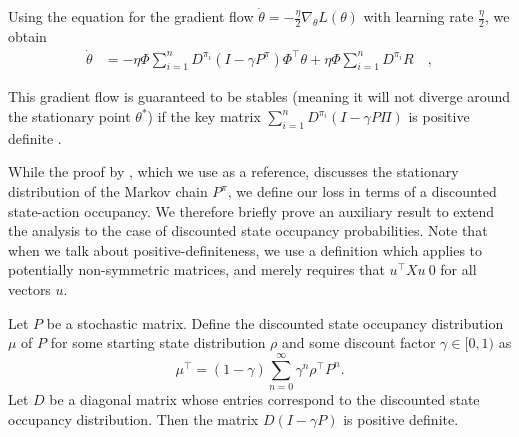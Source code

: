 Using the equation for the gradient flow $\dot{\theta} = - \frac{\eta}{2} \nabla_\theta L(\theta)$ with learning rate $\frac{\eta}{2}$, we obtain
\begin{align}
    \dot\theta &= - \eta \Phi \sum_{i=1}^n D^{\pi_i} \left(I - \gamma P^\pi \right)\Phi^\top \theta + \eta \Phi \sum_{i=1}^n D^{\pi_i} R\quad,
\end{align}

This gradient flow is guaranteed to be stables (meaning it will not diverge around the stationary point $\theta^*$) if the key matrix $\sum_{i=1}^n D^{\pi_i} \left(I - \gamma P \Pi \right)$ is positive definite \textcite{sutton1988learning}. 

While the proof by \textcite{sutton1988learning}, which we use as a reference, discusses the stationary distribution of the Markov chain $P^\pi$, we define our loss in terms of a discounted state-action occupancy. 
We therefore briefly prove an auxiliary result to extend the analysis to the case of discounted state occupancy probabilities.
Note that when we talk about positive-definiteness, we use a definition which applies to potentially non-symmetric matrices, and merely requires that $u^\top X u \> 0$ for all vectors $u$.

\begin{proposition}
\label{prop:aux}
Let $P$ be a stochastic matrix. Define the discounted state occupancy distribution $\mu$ of $P$ for some starting state distribution $\rho$ and some discount factor $\gamma \in [0,1)$ as $$\mu^\top = (1 - \gamma) \sum_{n=0}^\infty \gamma^n \rho^\top P^n.$$ Let $D$ be a diagonal matrix whose entries correspond to the discounted state occupancy distribution.
Then the matrix $D(I - \gamma P)$ is positive definite.
\end{proposition}

